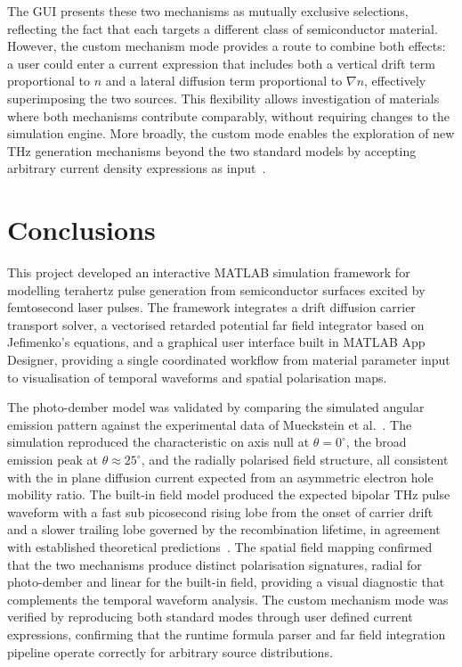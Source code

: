 \documentclass[12pt]{final_project_report}
\begin{document}
The GUI presents these two mechanisms as mutually exclusive selections, reflecting the fact that each targets a different class of semiconductor material. However, the custom mechanism mode provides a route to combine both effects: a user could enter a current expression that includes both a vertical drift term proportional to $n$ and a lateral diffusion term proportional to $\nabla n$, effectively superimposing the two sources. This flexibility allows investigation of materials where both mechanisms contribute comparably, without requiring changes to the simulation engine. More broadly, the custom mode enables the exploration of new THz generation mechanisms beyond the two standard models by accepting arbitrary current density expressions as input~\cite{Kefayati2024}.

\section{Conclusions}
This project developed an interactive MATLAB simulation framework for modelling terahertz pulse generation from semiconductor surfaces excited by femtosecond laser pulses. The framework integrates a drift diffusion carrier transport solver, a vectorised retarded potential far field integrator based on Jefimenko's equations, and a graphical user interface built in MATLAB App Designer, providing a single coordinated workflow from material parameter input to visualisation of temporal waveforms and spatial polarisation maps.

The photo-dember model was validated by comparing the simulated angular emission pattern against the experimental data of Mueckstein et al.~\cite{Mueckstein2015}. The simulation reproduced the characteristic on axis null at $\theta = 0^\circ$, the broad emission peak at $\theta \approx 25^\circ$, and the radially polarised field structure, all consistent with the in plane diffusion current expected from an asymmetric electron hole mobility ratio. The built-in field model produced the expected bipolar THz pulse waveform with a fast sub picosecond rising lobe from the onset of carrier drift and a slower trailing lobe governed by the recombination lifetime, in agreement with established theoretical predictions~\cite{SimulationTHz,auston_picosecond_1984}. The spatial field mapping confirmed that the two mechanisms produce distinct polarisation signatures, radial for photo-dember and linear for the built-in field, providing a visual diagnostic that complements the temporal waveform analysis. The custom mechanism mode was verified by reproducing both standard modes through user defined current expressions, confirming that the runtime formula parser and far field integration pipeline operate correctly for arbitrary source distributions.
\end{document}
